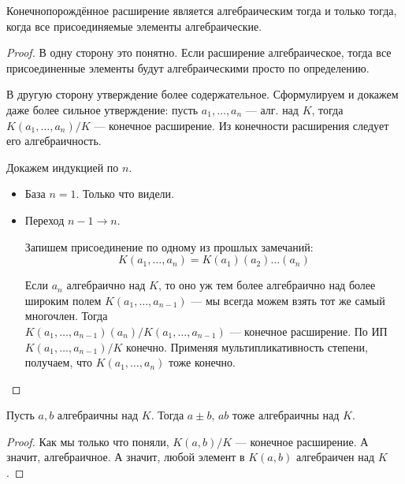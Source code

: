 \follow Конечнопорождённое расширение является алгебраическим тогда и только тогда, когда все присоединяемые элементы алгебраические.
\begin{proof}
    В одну сторону это понятно. Если расширение алгебраическое, тогда все присоединенные элементы будут алгебраическими просто по определению.

    В другую сторону утверждение более содержательное. Сформулируем и докажем даже более сильное утверждение: пусть $a_1, \dots, a_n$ --- алг. над $K$, тогда $K(a_1, \dots, a_n)/K$ --- конечное расширение. Из конечности расширения следует его алгебраичность.

    Докажем индукцией по $n$.
    \begin{itemize}
        \item База $n = 1$. Только что видели.
        \item Переход $n - 1 \to n$.
        
        Запишем присоединение по одному из прошлых замечаний:
        $$ K(a_1, \dots, a_n) = K(a_1)(a_2)\dots(a_n) $$

        Если $a_n$ алгебраично над $K$, то оно уж тем более алгебраично над более широким полем $K(a_1, \dots, a_{n-1})$ --- мы всегда можем взять тот же самый многочлен. Тогда \\$K(a_1, \dots, a_{n-1})(a_n) / K(a_1, \dots, a_{n-1})$ --- конечное расширение. По ИП $K(a_1, \dots, a_{n-1}) / K$ конечно. Применяя мультипликативность степени, получаем, что $K(a_1, \dots, a_n)$ тоже конечно.
    \end{itemize}
\end{proof}

\follow Пусть $a, b$ алгебраичны над $K$. Тогда $a \pm b$, $ab$ тоже алгебраичны над $K$.
\begin{proof}
    Как мы только что поняли, $K(a, b) / K$ --- конечное расширение. А значит, алгебраичное. А значит, любой элемент в $K(a, b)$ алгебраичен над $K$.
\end{proof}